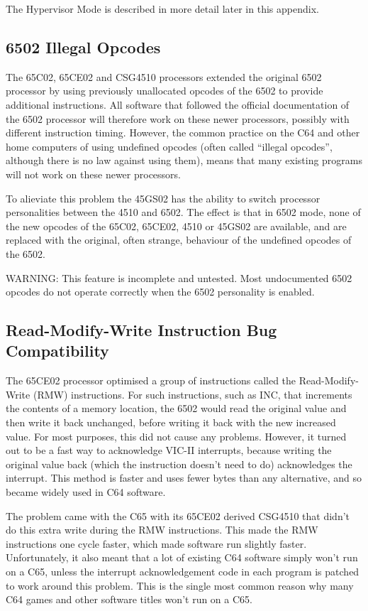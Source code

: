 The Hypervisor Mode is described in more detail later in this appendix.

\subsection{6502 Illegal Opcodes}

The 65C02, 65CE02 and CSG4510 processors extended the original 6502 processor
by using previously unallocated opcodes of the 6502 to provide additional
instructions.  All software that followed the official documentation of the 6502
processor will therefore work on these newer processors, possibly with different
instruction timing.  However, the common practice on the C64 and other home computers
of using undefined opcodes (often called ``illegal opcodes'', although there is no
law against using them), means that many existing programs will not work on these
newer processors.

To alieviate this problem the 45GS02 has the ability to switch processor personalities
between the 4510 and 6502.  The effect is that in 6502 mode, none of the new opcodes of
the 65C02, 65CE02, 4510 or 45GS02 are available, and are replaced with the original,
often strange, behaviour of the undefined opcodes of the 6502.

WARNING: This feature is incomplete and untested.  Most undocumented 6502 opcodes do not operate correctly when the 6502
personality is enabled.

\subsection{Read-Modify-Write Instruction Bug Compatibility}

The 65CE02 processor optimised a group of instructions called the Read-Modify-Write (RMW)
instructions.  For such instructions, such as INC, that increments the contents of a memory
location, the 6502 would read the original value and then write it back unchanged, before
writing it back with the new increased value.  For most purposes, this did not cause any
problems. However, it turned out to be a fast way to acknowledge VIC-II interrupts, because
writing the original value back (which the instruction doesn't need to do) acknowledges
the interrupt.  This method is faster and uses fewer bytes than any alternative, and so
became widely used in C64 software.

The problem came with the C65 with its 65CE02 derived CSG4510 that didn't do this extra write
during the RMW instructions.  This made the RMW instructions one cycle faster, which made
software run slightly faster. Unfortunately, it also meant that a lot of existing C64 software
simply won't run on a C65, unless the interrupt acknowledgement code in each program is patched
to work around this problem. This is the single most common reason why many C64 games and other
software titles won't run on a C65.

